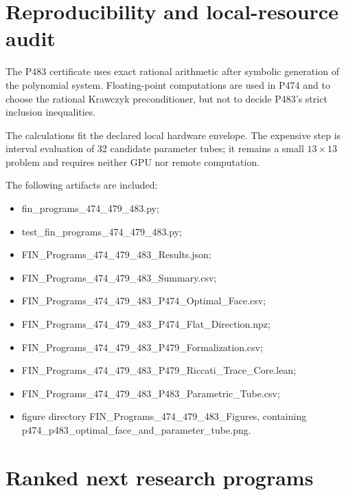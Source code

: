 \documentclass[11pt,a4paper,openany]{report}
\begin{document}
\chapter{Reproducibility and local-resource audit}

The P483 certificate uses exact rational arithmetic after symbolic generation of the polynomial system. Floating-point computations are used in P474 and to choose the rational Krawczyk preconditioner, but not to decide P483's strict inclusion inequalities.

The calculations fit the declared local hardware envelope. The expensive step is interval evaluation of 32 candidate parameter tubes; it remains a small \(13\times13\) problem and requires neither GPU nor remote computation.

The following artifacts are included:

\begin{itemize}
\item 
fin\_programs\_474\_479\_483.py;

\item 
test\_fin\_programs\_474\_479\_483.py;

\item 
FIN\_Programs\_474\_479\_483\_Results.json;

\item 
FIN\_Programs\_474\_479\_483\_Summary.csv;

\item 
FIN\_Programs\_474\_479\_483\_P474\_Optimal\_Face.csv;

\item 
FIN\_Programs\_474\_479\_483\_P474\_Flat\_Direction.npz;

\item 
FIN\_Programs\_474\_479\_483\_P479\_Formalization.csv;

\item 
FIN\_Programs\_474\_479\_483\_P479\_Riccati\_Trace\_Core.lean;

\item 
FIN\_Programs\_474\_479\_483\_P483\_Parametric\_Tube.csv;

\item 
figure directory FIN\_Programs\_474\_479\_483\_Figures, containing p474\_p483\_optimal\_face\_and\_parameter\_tube.png.

\end{itemize}

\chapter{Ranked next research programs}
\end{document}
